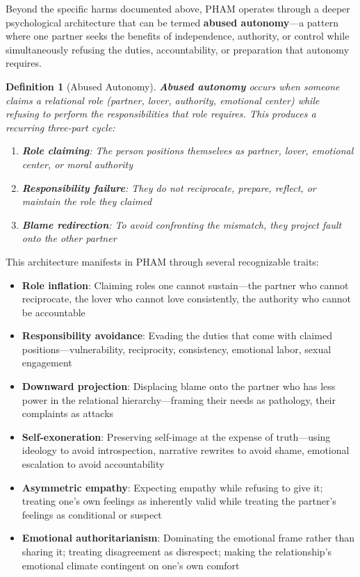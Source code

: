 \documentclass[12pt, letterpaper]{article}
\newtheorem{definition}{Definition}[section]
\begin{document}
Beyond the specific harms documented above, PHAM operates through a deeper psychological architecture that can be termed \textbf{abused autonomy}---a pattern where one partner seeks the benefits of independence, authority, or control while simultaneously refusing the duties, accountability, or preparation that autonomy requires.

\begin{definition}[Abused Autonomy]
\textbf{Abused autonomy} occurs when someone claims a relational role (partner, lover, authority, emotional center) while refusing to perform the responsibilities that role requires. This produces a recurring three-part cycle:
\begin{enumerate}
    \item \textbf{Role claiming}: The person positions themselves as partner, lover, emotional center, or moral authority
    \item \textbf{Responsibility failure}: They do not reciprocate, prepare, reflect, or maintain the role they claimed
    \item \textbf{Blame redirection}: To avoid confronting the mismatch, they project fault onto the other partner
\end{enumerate}
\end{definition}

This architecture manifests in PHAM through several recognizable traits:

\begin{itemize}
    \item \textbf{Role inflation}: Claiming roles one cannot sustain---the partner who cannot reciprocate, the lover who cannot love consistently, the authority who cannot be accountable
    
    \item \textbf{Responsibility avoidance}: Evading the duties that come with claimed positions---vulnerability, reciprocity, consistency, emotional labor, sexual engagement
    
    \item \textbf{Downward projection}: Displacing blame onto the partner who has less power in the relational hierarchy---framing their needs as pathology, their complaints as attacks
    
    \item \textbf{Self-exoneration}: Preserving self-image at the expense of truth---using ideology to avoid introspection, narrative rewrites to avoid shame, emotional escalation to avoid accountability
    
    \item \textbf{Asymmetric empathy}: Expecting empathy while refusing to give it; treating one's own feelings as inherently valid while treating the partner's feelings as conditional or suspect
    
    \item \textbf{Emotional authoritarianism}: Dominating the emotional frame rather than sharing it; treating disagreement as disrespect; making the relationship's emotional climate contingent on one's own comfort
\end{itemize}
\end{document}
